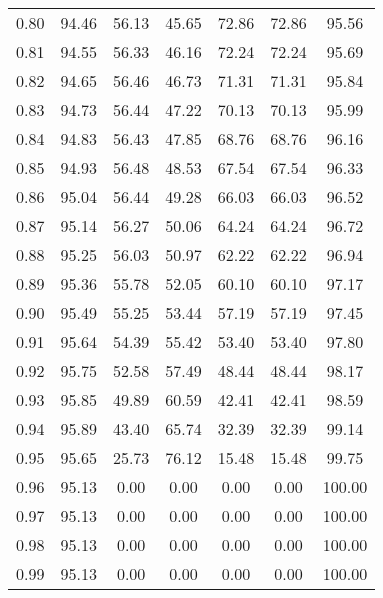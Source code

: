\begin{tabular}{|c|c|c|c|c|c|c|}
      0.80 &     94.46 &     56.13 &      45.65 &   72.86 &      72.86 &         95.56 \\
      0.81 &     94.55 &     56.33 &      46.16 &   72.24 &      72.24 &         95.69 \\
      0.82 &     94.65 &     56.46 &      46.73 &   71.31 &      71.31 &         95.84 \\
      0.83 &     94.73 &     56.44 &      47.22 &   70.13 &      70.13 &         95.99 \\
      0.84 &     94.83 &     56.43 &      47.85 &   68.76 &      68.76 &         96.16 \\
      0.85 &     94.93 &     56.48 &      48.53 &   67.54 &      67.54 &         96.33 \\
      0.86 &     95.04 &     56.44 &      49.28 &   66.03 &      66.03 &         96.52 \\
      0.87 &     95.14 &     56.27 &      50.06 &   64.24 &      64.24 &         96.72 \\
      0.88 &     95.25 &     56.03 &      50.97 &   62.22 &      62.22 &         96.94 \\
      0.89 &     95.36 &     55.78 &      52.05 &   60.10 &      60.10 &         97.17 \\
      0.90 &     95.49 &     55.25 &      53.44 &   57.19 &      57.19 &         97.45 \\
      0.91 &     95.64 &     54.39 &      55.42 &   53.40 &      53.40 &         97.80 \\
      0.92 &     95.75 &     52.58 &      57.49 &   48.44 &      48.44 &         98.17 \\
      0.93 &     95.85 &     49.89 &      60.59 &   42.41 &      42.41 &         98.59 \\
      0.94 &     95.89 &     43.40 &      65.74 &   32.39 &      32.39 &         99.14 \\
      0.95 &     95.65 &     25.73 &      76.12 &   15.48 &      15.48 &         99.75 \\
      0.96 &     95.13 &      0.00 &       0.00 &    0.00 &       0.00 &        100.00 \\
      0.97 &     95.13 &      0.00 &       0.00 &    0.00 &       0.00 &        100.00 \\
      0.98 &     95.13 &      0.00 &       0.00 &    0.00 &       0.00 &        100.00 \\
      0.99 &     95.13 &      0.00 &       0.00 &    0.00 &       0.00 &        100.00 \\
\bottomrule
\end{tabular}

